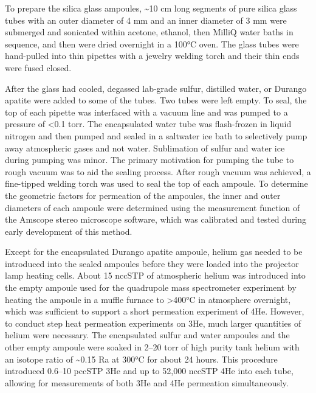 To prepare the silica glass ampoules, \textasciitilde10 cm long segments of pure silica glass tubes with an outer diameter of 4 mm and an inner diameter of 3 mm were submerged and sonicated within acetone, ethanol, then MilliQ water baths in sequence, and then were dried overnight in a 100°C oven. The glass tubes were hand-pulled into thin pipettes with a jewelry welding torch and their thin ends were fused closed.

After the glass had cooled, degassed lab-grade sulfur, distilled water, or Durango apatite were added to some of the tubes. Two tubes were left empty. To seal, the top of each pipette was interfaced with a vacuum line and was pumped to a pressure of \textless0.1 torr. The encapsulated water tube was flash-frozen in liquid nitrogen and then pumped and sealed in a saltwater ice bath to selectively pump away atmospheric gases and not water. Sublimation of sulfur and water ice during pumping was minor. The primary motivation for pumping the tube to rough vacuum was to aid the sealing process. After rough vacuum was achieved, a fine-tipped welding torch was used to seal the top of each ampoule. To determine the geometric factors for permeation of the ampoules, the inner and outer diameters of each ampoule were determined using the measurement function of the Amscope stereo microscope software, which was calibrated and tested during early development of this method.

Except for the encapsulated Durango apatite ampoule, helium gas needed to be introduced into the sealed ampoules before they were loaded into the projector lamp heating cells. About 15 nccSTP of atmospheric helium was introduced into the empty ampoule used for the quadrupole mass spectrometer experiment by heating the ampoule in a muffle furnace to \textgreater400°C in atmosphere overnight, which was sufficient to support a short permeation experiment of 4He. However, to conduct step heat permeation experiments on 3He, much larger quantities of helium were necessary. The encapsulated sulfur and water ampoules and the other empty ampoule were soaked in 2--20 torr of high purity tank helium with an isotope ratio of \textasciitilde0.15 Ra at 300°C for about 24 hours. This procedure introduced 0.6--10 pccSTP 3He and up to 52,000 nccSTP 4He into each tube, allowing for measurements of both 3He and 4He permeation simultaneously.

